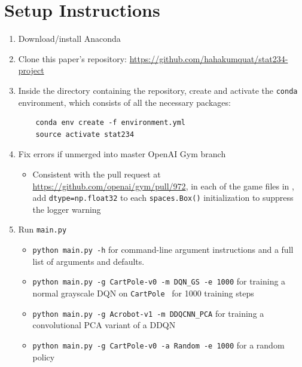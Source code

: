 \documentclass[11pt]{article}
\newcommand{\cp}{\texttt{CartPole}}
\begin{document}
\newpage
{}


\onecolumn

\appendix

\section{Setup Instructions}
\label{app:getting_started}

\begin{enumerate}
    \item Download/install Anaconda
    
    \item Clone this paper's repository: \url{https://github.com/hahakumquat/stat234-project}
    
    \item Inside the directory containing the repository, create and activate the \texttt{conda} environment, which consists of all the necessary packages: 
    
    \begin{verbatim}
    conda env create -f environment.yml
    source activate stat234
    \end{verbatim}

    \item Fix errors if unmerged into master OpenAI Gym branch
    
    \begin{itemize}
        \item Consistent with the pull request at \url{https://github.com/openai/gym/pull/972}, in each of the game files in , add \texttt{dtype=np.float32} to each \texttt{spaces.Box()} initialization to suppress the logger warning
    \end{itemize}
    
    \item Run \texttt{main.py}
    
    \begin{itemize}
        \item \texttt{python main.py -h} for command-line argument instructions and a full list of arguments and defaults.
        \item \texttt{python main.py -g CartPole-v0 -m DQN\_GS -e 1000} for training a normal grayscale DQN on \cp~ for 1000 training steps
        \item \texttt{python main.py -g Acrobot-v1 -m DDQCNN\_PCA} for training a convolutional PCA variant of a DDQN
        \item \texttt{python main.py -g CartPole-v0 -a Random -e 1000} for a random policy
    \end{itemize}
\end{enumerate}
\end{document}
